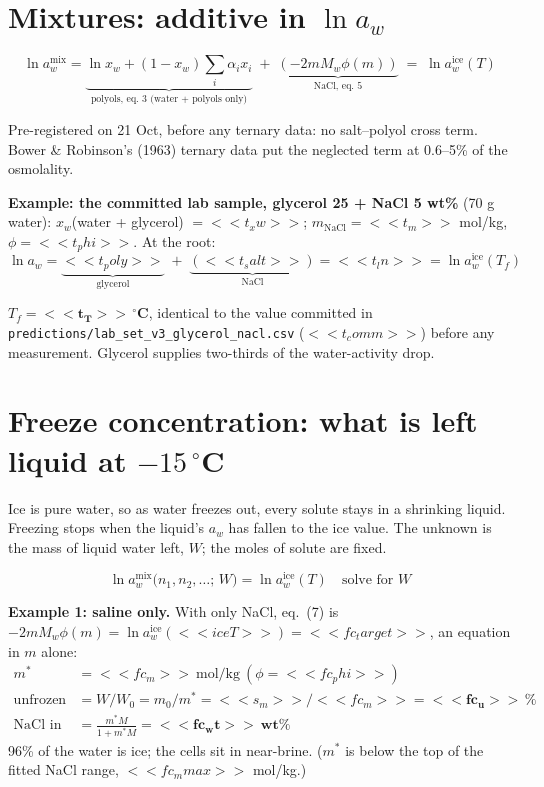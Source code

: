 \documentclass[11pt,a4paper]{article}
\newcommand{\file}[1]{\texttt{\small #1}}
\newcommand{\aice}{\ln a_w^{\mathrm{ice}}}
\begin{document}
\section{Mixtures: additive in $\ln a_w$}
\begin{eqbox}
\[ \ln a_w^{\mathrm{mix}}=\underbrace{\ln x_w+(1-x_w)\textstyle\sum_i\alpha_ix_i}_{\text{polyols, eq. 3 (water + polyols only)}}
\;+\;\underbrace{\left(-2mM_w\phi(m)\right)}_{\text{NaCl, eq. 5}} \;=\;\aice(T)\tag{6}\]
\end{eqbox}
Pre-registered on 21 Oct, before any ternary data: no salt--polyol cross term. Bower \& Robinson's (1963) ternary data put the
neglected term at 0.6--5\% of the osmolality.

\textbf{Example: the committed lab sample, glycerol 25 + NaCl 5 wt\%} (70 g water):
$x_w$(water + glycerol) $=<<t_xw>>$; $m_{\text{NaCl}}=<<t_m>>$ mol/kg, $\phi=<<t_phi>>$. At the root:
\[
\ln a_w=\underbrace{<<t_poly>>}_{\text{glycerol}}\;+\;\underbrace{(<<t_salt>>)}_{\text{NaCl}}=<<t_ln>>=\aice(T_f)
\]
\begin{result}
$T_f=\mathbf{<<t_T>>\,^\circ}$\textbf{C}, identical to the value committed in \file{predictions/lab\_set\_v3\_glycerol\_nacl.csv}
($<<t_comm>>$) before any measurement. Glycerol supplies two-thirds of the water-activity drop.
\end{result}

\section{Freeze concentration: what is left liquid at $-15\,^\circ$C}
Ice is pure water, so as water freezes out, every solute stays in a shrinking liquid. Freezing stops when the liquid's
$a_w$ has fallen to the ice value. The unknown is the mass of liquid water left, $W$; the moles of solute are fixed.
\begin{eqbox}
\[ \ln a_w^{\mathrm{mix}}\big(n_1,n_2,\dots;\,W\big)=\aice(T)\quad\text{solve for } W \tag{7}\]
\end{eqbox}
\textbf{Example 1: saline only.} With only NaCl, eq.~(7) is $-2mM_w\phi(m)=\aice(<<iceT>>)=<<fc_target>>$, an equation in $m$ alone:
\begin{align*}
m^{*}&=<<fc_m>>\ \text{mol/kg}\ (\phi=<<fc_phi>>)\\
\text{unfrozen water}&=W/W_0=m_0/m^{*}=<<s_m>>/<<fc_m>>=\mathbf{<<fc_u>>\,\%}\\
\text{NaCl in the liquid}&=\frac{m^{*}M}{1+m^{*}M}=\mathbf{<<fc_wt>>\ wt\%}
\end{align*}
96\% of the water is ice; the cells sit in near-brine. ($m^{*}$ is below the top of the fitted NaCl range, $<<fc_mmax>>$ mol/kg.)
\end{document}
